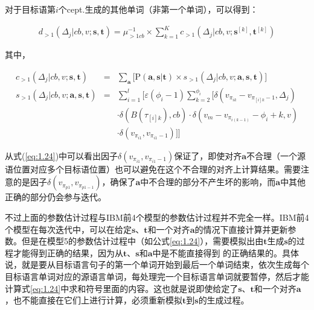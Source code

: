\begin{appendices}
对于目标语第$i$个cept.生成的其他单词（非第一个单词），可以得到：

\begin{eqnarray}
d_{>1}(\Delta_j|cb,v;\mathbf{s},\mathbf{t}) = \mu_{>1cb}^{-1} \times \sum_{k=1}^{K}c_{>1}(\Delta_j|cb,v;\mathbf{s}^{[k]},\mathbf{t}^{[k]})
\label{eq:1.26}
\end{eqnarray}

其中，

\begin{eqnarray}
c_{>1}(\Delta_j|cb,v;\mathbf{s},\mathbf{t})                   & =  & \sum_{\mathbf{a}}\Big[\textrm{P}(\mathbf{a},\mathbf{s}|\mathbf{t}) \times s_{>1}(\Delta_j|cb,v;\mathbf{a},\mathbf{s},\mathbf{t}) \Big] \label{eq:1.27} \\
s_{>1}(\Delta_j|cb,v;\mathbf{a},\mathbf{s},\mathbf{t}) & = & \sum_{i=1}^l\Big[\varepsilon(\phi_i-1)\sum_{k=2}^{\phi_i} \big[\delta(v_{\pi_{ik}}-v_{\pi_{[i]k}-1},\Delta_j)  \nonumber \\
                                                                                    &     & \cdot \delta(B(\tau_{[i]k}) ,cb) \cdot \delta(v_m-v_{\pi_{i(k-1)}}-\phi_i+k,v) \nonumber \\
                                                                                    &     & \cdot \delta(v_{\pi_{i1}},v_{\pi_{i1}-1}) \big] \Big] \label{eq:1.28}
\end{eqnarray}

\vspace{0.5em}

\parinterval 从式(\ref{eq:1.24})中可以看出因子$\delta(v_{\pi_{i1}},v_{\pi_{i1}-1})$保证了，即使对齐$\mathbf{a}$不合理（一个源语位置对应多个目标语位置）也可以避免在这个不合理的对齐上计算结果。需要注意的是因子$\delta(v_{\pi_{p1}},v_{\pi_{p1-1}})$，确保了$\mathbf{a}$中不合理的部分不产生坏的影响，而$\mathbf{a}$中其他正确的部分仍会参与迭代。

\parinterval 不过上面的参数估计过程与IBM前4个模型的参数估计过程并不完全一样。IBM前4个模型在每次迭代中，可以在给定$\mathbf{s}$、$\mathbf{t}$和一个对齐$\mathbf{a}$的情况下直接计算并更新参数。但是在模型5的参数估计过程中（如公式\ref{eq:1.24}），需要模拟出由$\mathbf{t}$生成$\mathbf{s}$的过程才能得到正确的结果，因为从$\mathbf{t}$、$\mathbf{s}$和$\mathbf{a}$中是不能直接得到 的正确结果的。具体说，就是要从目标语言句子的第一个单词开始到最后一个单词结束，依次生成每个目标语言单词对应的源语言单词，每处理完一个目标语言单词就要暂停，然后才能计算式\ref{eq:1.24}中求和符号里面的内容。这也就是说即使给定了$\mathbf{s}$、$\mathbf{t}$和一个对齐$\mathbf{a}$，也不能直接在它们上进行计算，必须重新模拟$\mathbf{t}$到$\mathbf{s}$的生成过程。


\end{appendices}
